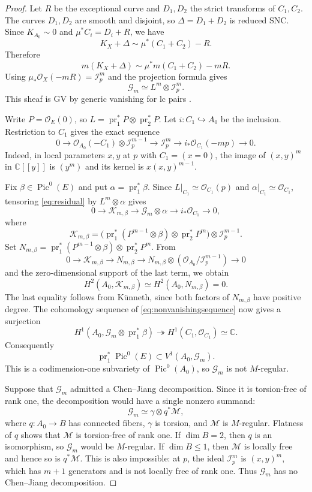 \documentclass[10pt,a4paper]{amsart}
\newcommand{\OO}{\mathcal O}
\newcommand{\GG}{\mathcal G}
\newcommand{\II}{\mathcal I}
\newcommand{\CC}{\mathbb C}
\DeclareMathOperator{\Pic}{Pic}
\DeclareMathOperator{\pr}{pr}
\begin{document}
\begin{proof}
Let $R$ be the exceptional curve and $D_1,D_2$ the strict transforms of $C_1,C_2$. The curves $D_1,D_2$ are smooth and disjoint, so $\Delta=D_1+D_2$ is reduced SNC. Since $K_{A_0}\sim0$ and $\mu^*C_i=D_i+R$, we have
\[
K_X+\Delta\sim\mu^*(C_1+C_2)-R.
\]
Therefore
\[
m(K_X+\Delta)\sim\mu^*m(C_1+C_2)-mR.
\]
Using $\mu_*\OO_X(-mR)=\II_p^m$ and the projection formula gives
\[
\GG_m\simeq L^m\otimes\II_p^m.
\]
This sheaf is GV by generic vanishing for lc pairs \cite[Variant 5.5]{PS}.

Write $P=\OO_E(0)$, so $L=\pr_1^*P\otimes\pr_2^*P$. Let $i:C_1\hookrightarrow A_0$ be the inclusion. Restriction to $C_1$ gives the exact sequence
\begin{equation}\label{eq:residual}
0\longrightarrow\OO_{A_0}(-C_1)\otimes\II_p^{m-1}
\longrightarrow\II_p^m\longrightarrow i_*\OO_{C_1}(-mp)\longrightarrow0.
\end{equation}
Indeed, in local parameters $x,y$ at $p$ with $C_1=(x=0)$, the image of $(x,y)^m$ in $\CC[[y]]$ is $(y^m)$ and its kernel is $x(x,y)^{m-1}$.

Fix $\beta\in\Pic^0(E)$ and put $\alpha=\pr_1^*\beta$. Since $L|_{C_1}\simeq\OO_{C_1}(p)$ and $\alpha|_{C_1}\simeq\OO_{C_1}$, tensoring \eqref{eq:residual} by $L^m\otimes\alpha$ gives
\begin{equation}\label{eq:nonvanishingsequence}
0\longrightarrow\mathcal K_{m,\beta}\longrightarrow\GG_m\otimes\alpha
\longrightarrow i_*\OO_{C_1}\longrightarrow0,
\end{equation}
where
\[
\mathcal K_{m,\beta}=
\bigl(\pr_1^*(P^{m-1}\otimes\beta)\otimes\pr_2^*P^m\bigr)\otimes\II_p^{m-1}.
\]
Set $N_{m,\beta}=\pr_1^*(P^{m-1}\otimes\beta)\otimes\pr_2^*P^m$. From
\[
0\longrightarrow\mathcal K_{m,\beta}\longrightarrow N_{m,\beta}
\longrightarrow N_{m,\beta}\otimes(\OO_{A_0}/\II_p^{m-1})\longrightarrow0
\]
and the zero-dimensional support of the last term, we obtain
\[
H^2(A_0,\mathcal K_{m,\beta})\simeq H^2(A_0,N_{m,\beta})=0.
\]
The last equality follows from K\"unneth, since both factors of $N_{m,\beta}$ have positive degree. The cohomology sequence of \eqref{eq:nonvanishingsequence} now gives a surjection
\[
H^1(A_0,\GG_m\otimes\pr_1^*\beta)\twoheadrightarrow
H^1(C_1,\OO_{C_1})\simeq\CC.
\]
Consequently
\[
\pr_1^*\Pic^0(E)\subset V^1(A_0,\GG_m).
\]
This is a codimension-one subvariety of $\Pic^0(A_0)$, so $\GG_m$ is not $M$-regular.

Suppose that $\GG_m$ admitted a Chen--Jiang decomposition. Since it is torsion-free of rank one, the decomposition would have a single nonzero summand:
\[
\GG_m\simeq\gamma\otimes q^*\mathcal M,
\]
where $q:A_0\to B$ has connected fibers, $\gamma$ is torsion, and $\mathcal M$ is $M$-regular. Flatness of $q$ shows that $\mathcal M$ is torsion-free of rank one. If $\dim B=2$, then $q$ is an isomorphism, so $\GG_m$ would be $M$-regular. If $\dim B\le1$, then $\mathcal M$ is locally free and hence so is $q^*\mathcal M$. This is also impossible: at $p$, the ideal $\II_p^m$ is $(x,y)^m$, which has $m+1$ generators and is not locally free of rank one. Thus $\GG_m$ has no Chen--Jiang decomposition.
\end{proof}
\end{document}
